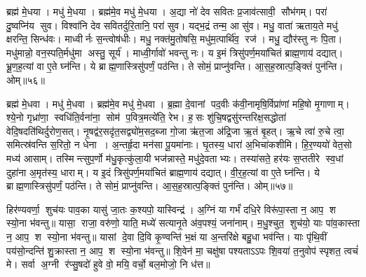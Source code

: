 ब्रह्म॑ मे॒धया। मधु॑ मे॒धया। ब्रह्म॑मे॒व मधु॑ मे॒धया। अ॒द्या नो॑ देव सवितः प्र॒जाव॑त्सावी॒ सौभ॑गम्। परा॑ दु॒ष्वप्नि॑य सुव। विश्वा॑नि देव सवितर्दुरि॒तानि॒ परा॑ सुव। यद्भ॒द्रं तन्म॒ आ सु॑व। मधु॒ वाता॑ ऋताय॒ते मधु॑ क्षरन्ति॒ सिन्ध॑वः। माध्वीर्नः स॒न्त्वोष॑धीः। मधु॒ नक्त॑मु॒तोषसि॒ मधु॑म॒त्पार्थि॑व॒ रज॑। मधु॒ द्यौर॑स्तु नः पि॒ता। मधु॑मान्नो॒ वन॒स्पति॒र्मधु॑मा अस्तु॒ सूर्य॑। माध्वी॒र्गावो॑ भवन्तु नः। य इ॒मं त्रिसु॑पर्ण॒मया॑चितं ब्राह्म॒णाय॑ दद्यात्। भ्रू॒ण॒ह॒त्यां वा ए॒ते घ्न॑न्ति। ये ब्राह्म॒णास्त्रिसु॑पर्णं॒ पठ॑न्ति। ते सोमं॒ प्राप्नु॑वन्ति। आ॒स॒ह॒स्रात्प॒ङ्क्तिं पुन॑न्ति। ओम्॥५६॥

ब्रह्म॑ मे॒धवा। मधु॑ मे॒धवा। ब्रह्म॑मे॒व मधु॑ मे॒धवा। ब्र॒ह्मा दे॒वानां पद॒वीः क॑वी॒नामृषि॒र्विप्रा॑णां महि॒षो मृ॒गाणाम्। श्ये॒नो गृध्रा॑णा॒ स्वधि॑ति॒र्वना॑ना॒ सोम॑ प॒वित्र॒मत्ये॑ति॒ रेभ\sn{}। ह॒सः शु॑चि॒षद्वसु॑रन्तरिक्ष॒सद्धोता॑ वेदि॒षदति॑थिर्दुरोण॒सत्। नृ॒षद्व॑र॒सदृ॑त॒सद्व्यो॑म॒सद॒ब्जा गो॒जा ऋ॑त॒जा अ॑द्रि॒जा ऋ॒तं बृ॒हत्। ऋ॒चे त्वा॑ रु॒चे त्वा॒ समित्स्र॑वन्ति स॒रितो॒ न धेना। अ॒न्तर्\mbox{}हृ॒दा मन॑सा पू॒यमा॑नाः। घृ॒तस्य॒ धारा॑ अ॒भिचा॑कशीमि। हि॒र॒ण्ययो॑ वेत॒सो मध्य॑ आसाम्। \mbox{तस्मि\hspace{1ex}\hspace{-1ex}न्त्सु}\-प॒र्णो म॑धु॒कृत्कु॑ला॒यी भज॑न्नास्ते॒ मधु॑\-दे॒वताभ्यः। तस्या॑सते॒ हर॑यः स॒प्ततीरे स्व॒धां दुहा॑ना अ॒मृत॑स्य॒ धाराम्। य इ॒दं त्रिसु॑पर्ण॒मया॑चितं ब्राह्म॒णाय॑ दद्यात्। वी॒र॒ह॒त्यां वा ए॒ते घ्न॑न्ति। ये ब्राह्म॒णास्त्रिसु॑पर्णं॒ पठ॑न्ति। ते सोमं॒ प्राप्नु॑वन्ति। आ॒स॒ह॒स्रात्प॒ङ्क्तिं पुन॑न्ति। ओम्॥५७॥
\closesection

हिर॑ण्यवर्णा॒ शुच॑यः पाव॒का यासु॑ जा॒तः क॒श्यपो॒ यास्विन्द्र॑।
अ॒ग्निं या गर्भं॑ दधि॒रे विरू॑पा॒स्ता न॒ आप॒ श स्यो॒ना भ॑वन्तु॥ 
यासा॒ राजा॒ वरु॑णो॒ याति॒ मध्ये॑ सत्यानृ॒ते अ॑व॒पश्यं॒ जना॑नाम्।
म॒धु॒श्चुत॒ शुच॑यो॒ याः पा॑व॒कास्ता न॒ आप॒ श स्यो॒ना भ॑वन्तु॥ 
यासां दे॒वा दि॒वि कृ॒ण्वन्ति॑ भ॒क्षं या अ॒न्तरि॑क्षे बहु॒धा भव॑न्ति।
याः पृ॑थि॒वीं पय॑सो॒न्दन्ति॑ शु॒क्रास्ता न॒ आप॒ श स्यो॒ना भ॑वन्तु॥ 
शि॒वेन॑ मा॒ चक्षु॑षा पश्यताऽऽपः शि॒वया॑ त॒नुवोप॑ स्पृशत॒ त्वचं॑ मे।
सर्वा अ॒ग्नी र॑प्सु॒षदो॑ हुवे वो॒ मयि॒ वर्चो॒ बल॒मोजो॒ नि ध॑त्त॥
\clearpage

 
 
\clearpage
 
 
\clearpage
 
\clearpage
\setmainfont[Script=Devanagari,Mapping=tex-text]{Sanskrit 2003}

